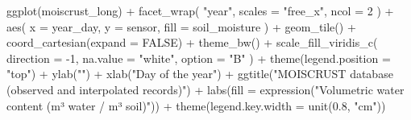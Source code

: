 \documentclass[
  table]{article}
\newenvironment{Shaded}{\begin{snugshade}}{\end{snugshade}}
\newcommand{\AttributeTok}[1]{\textcolor[rgb]{0.77,0.63,0.00}{#1}}
\newcommand{\ConstantTok}[1]{\textcolor[rgb]{0.00,0.00,0.00}{#1}}
\newcommand{\DecValTok}[1]{\textcolor[rgb]{0.00,0.00,0.81}{#1}}
\newcommand{\FloatTok}[1]{\textcolor[rgb]{0.00,0.00,0.81}{#1}}
\newcommand{\FunctionTok}[1]{\textcolor[rgb]{0.00,0.00,0.00}{#1}}
\newcommand{\NormalTok}[1]{#1}
\newcommand{\SpecialCharTok}[1]{\textcolor[rgb]{0.00,0.00,0.00}{#1}}
\newcommand{\StringTok}[1]{\textcolor[rgb]{0.31,0.60,0.02}{#1}}
\begin{document}
\begin{Shaded}
\begin{Highlighting}[]
\FunctionTok{ggplot}\NormalTok{(moiscrust\_long) }\SpecialCharTok{+} 
  \FunctionTok{facet\_wrap}\NormalTok{(}
    \StringTok{"year"}\NormalTok{, }
    \AttributeTok{scales =} \StringTok{"free\_x"}\NormalTok{, }
    \AttributeTok{ncol =} \DecValTok{2}
\NormalTok{    ) }\SpecialCharTok{+}
  \FunctionTok{aes}\NormalTok{(}
    \AttributeTok{x =}\NormalTok{ year\_day, }
    \AttributeTok{y =}\NormalTok{ sensor, }
    \AttributeTok{fill =}\NormalTok{ soil\_moisture}
\NormalTok{    ) }\SpecialCharTok{+} 
  \FunctionTok{geom\_tile}\NormalTok{() }\SpecialCharTok{+} 
  \FunctionTok{coord\_cartesian}\NormalTok{(}\AttributeTok{expand =} \ConstantTok{FALSE}\NormalTok{) }\SpecialCharTok{+}
  \FunctionTok{theme\_bw}\NormalTok{() }\SpecialCharTok{+} 
  \FunctionTok{scale\_fill\_viridis\_c}\NormalTok{(}
    \AttributeTok{direction =} \SpecialCharTok{{-}}\DecValTok{1}\NormalTok{, }
    \AttributeTok{na.value =} \StringTok{"white"}\NormalTok{, }
    \AttributeTok{option =} \StringTok{"B"}
\NormalTok{    ) }\SpecialCharTok{+}
  \FunctionTok{theme}\NormalTok{(}\AttributeTok{legend.position =} \StringTok{"top"}\NormalTok{) }\SpecialCharTok{+} 
  \FunctionTok{ylab}\NormalTok{(}\StringTok{""}\NormalTok{) }\SpecialCharTok{+} 
  \FunctionTok{xlab}\NormalTok{(}\StringTok{"Day of the year"}\NormalTok{) }\SpecialCharTok{+}
  \FunctionTok{ggtitle}\NormalTok{(}\StringTok{"MOISCRUST database (observed and interpolated records)"}\NormalTok{) }\SpecialCharTok{+}
  \FunctionTok{labs}\NormalTok{(}\AttributeTok{fill =} \FunctionTok{expression}\NormalTok{(}\StringTok{"Volumetric water content (m³ water / m³ soil)"}\NormalTok{)) }\SpecialCharTok{+} 
  \FunctionTok{theme}\NormalTok{(}\AttributeTok{legend.key.width =} \FunctionTok{unit}\NormalTok{(}\FloatTok{0.8}\NormalTok{, }\StringTok{"cm"}\NormalTok{))}
\end{Highlighting}
\end{Shaded}
\end{document}
